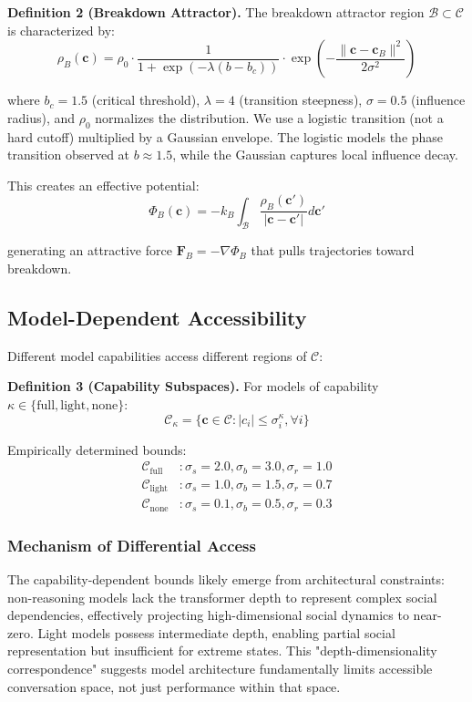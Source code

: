 \documentclass[11pt,letterpaper]{article}
\begin{document}
\textbf{Definition 2 (Breakdown Attractor).} The breakdown attractor region $\mathcal{B} \subset \mathcal{C}$ is characterized by:
\begin{equation}
\rho_B(\mathbf{c}) = \rho_0 \cdot \frac{1}{1 + \exp(-\lambda(b - b_c))} \cdot \exp\left(-\frac{\|\mathbf{c} - \mathbf{c}_B\|^2}{2\sigma^2}\right)
\end{equation}

where $b_c = 1.5$ (critical threshold), $\lambda = 4$ (transition steepness), $\sigma = 0.5$ (influence radius), and $\rho_0$ normalizes the distribution. We use a logistic transition (not a hard cutoff) multiplied by a Gaussian envelope. The logistic models the phase transition observed at $b \approx 1.5$, while the Gaussian captures local influence decay.

This creates an effective potential:
\begin{equation}
\Phi_B(\mathbf{c}) = -k_B \int_{\mathcal{B}} \frac{\rho_B(\mathbf{c}')}{|\mathbf{c} - \mathbf{c}'|} d\mathbf{c}'
\end{equation}

generating an attractive force $\mathbf{F}_B = -\nabla \Phi_B$ that pulls trajectories toward breakdown.

\subsection{Model-Dependent Accessibility}

Different model capabilities access different regions of $\mathcal{C}$:

\textbf{Definition 3 (Capability Subspaces).} For models of capability $\kappa \in \{\text{full}, \text{light}, \text{none}\}$:
\begin{equation}
\mathcal{C}_\kappa = \{\mathbf{c} \in \mathcal{C} : |c_i| \leq \sigma_i^\kappa, \forall i\}
\end{equation}

Empirically determined bounds:
\begin{align}
\mathcal{C}_{\text{full}} &: \sigma_s = 2.0, \sigma_b = 3.0, \sigma_r = 1.0 \\
\mathcal{C}_{\text{light}} &: \sigma_s = 1.0, \sigma_b = 1.5, \sigma_r = 0.7 \\
\mathcal{C}_{\text{none}} &: \sigma_s = 0.1, \sigma_b = 0.5, \sigma_r = 0.3
\end{align}

\subsubsection{Mechanism of Differential Access}
The capability-dependent bounds likely emerge from architectural constraints: non-reasoning models lack the transformer depth to represent complex social dependencies, effectively projecting high-dimensional social dynamics to near-zero. Light models possess intermediate depth, enabling partial social representation but insufficient for extreme states. This "depth-dimensionality correspondence" suggests model architecture fundamentally limits accessible conversation space, not just performance within that space.
\end{document}
